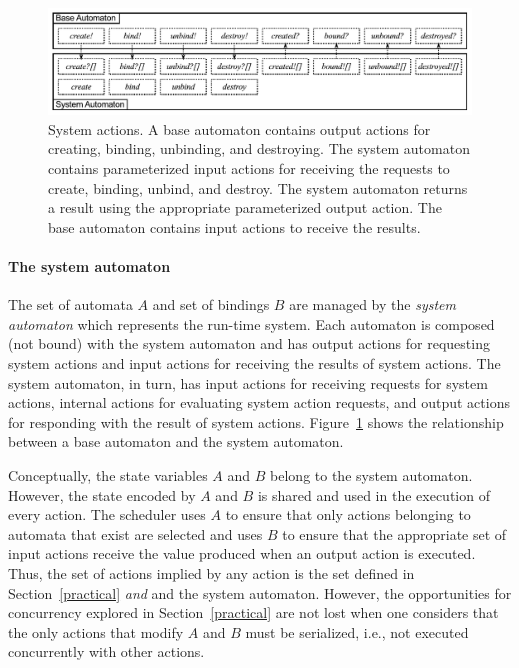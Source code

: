 
\begin{figure}
\center
\includegraphics[width=\columnwidth]{system_action}
\caption{System actions.
  A base automaton contains output actions for creating, binding, unbinding, and destroying.
  The system automaton contains parameterized input actions for receiving the requests to create, binding, unbind, and destroy.
  The system automaton returns a result using the appropriate parameterized output action.
  The base automaton contains input actions to receive the results.}
\label{system_action}
\end{figure}

\paragraph*{The system automaton}
The set of automata $A$ and set of bindings $B$ are managed by the \emph{system automaton} which represents the run-time system.
Each automaton is composed (not bound) with the system automaton and has output actions for requesting system actions and input actions for receiving the results of system actions.
The system automaton, in turn, has input actions for receiving requests for system actions, internal actions for evaluating system action requests, and output actions for responding with the result of system actions.
Figure~\ref{system_action} shows the relationship between a base automaton and the system automaton.

Conceptually, the state variables $A$ and $B$ belong to the system automaton.
However, the state encoded by $A$ and $B$ is shared and used in the execution of every action.
The scheduler uses $A$ to ensure that only actions belonging to automata that exist are selected and uses $B$ to ensure that the appropriate set of input actions receive the value produced when an output action is executed.
Thus, the set of actions implied by any action is the set defined in Section~\ref{practical} \emph{and} and the system automaton.
However, the opportunities for concurrency explored in Section~\ref{practical} are not lost when one considers that the only actions that modify $A$ and $B$ must be serialized, i.e., not executed concurrently with other actions.

